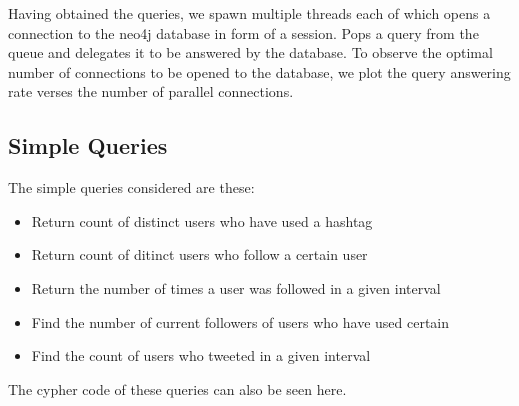 \documentclass[letterpaper,10pt,english]{sphinxmanual}
\begin{document}
Having obtained the queries, we spawn multiple threads each of which opens a connection to the neo4j database in form of a session. Pops a query from the queue and delegates it to be answered by the database. To observe the optimal number of connections to be opened to the database, we plot the query answering rate verses the number of parallel connections.


\subsection{Simple Queries}
\label{\detokenize{benchmarking:simple-queries}}
The simple queries considered are these:
\begin{itemize}
\item {} 
Return count of distinct users who have used a hashtag

\item {} 
Return count of ditinct users who follow a certain user

\item {} 
Return the number of times a user was followed in a given interval

\item {} 
Find the number of current followers of users who have used certain

\item {} 
Find the count of users who tweeted in a given interval

\end{itemize}

The cypher code of these queries can also be seen here.
\end{document}
